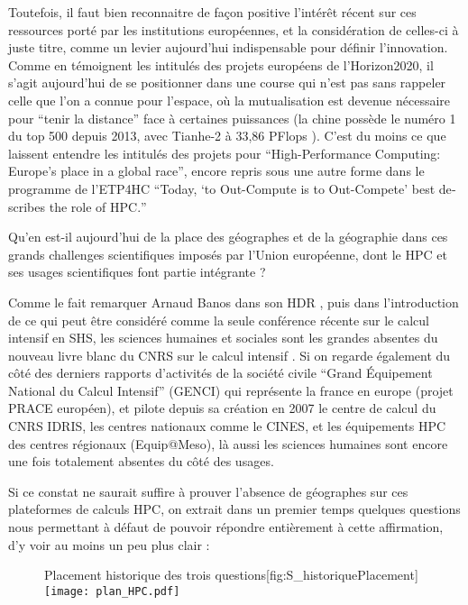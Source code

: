 Toutefois, il faut bien reconnaitre de façon positive l'intérêt récent sur ces ressources porté par les institutions européennes, et la considération de celles-ci à juste titre, comme un levier aujourd'hui indispensable pour définir l'innovation. Comme en témoignent les intitulés des projets européens de l'Horizon2020, il s'agit aujourd'hui de se positionner dans une course qui n'est pas sans rappeler celle que l'on a connue pour l'espace, où la mutualisation est devenue nécessaire pour \enquote{tenir la distance} face à certaines puissances (la chine possède le numéro 1 du top 500 depuis 2013, avec Tianhe-2 à 33,86 PFlops ). C'est du moins ce que laissent entendre les intitulés des projets pour \autocite{HPCHorizon2020} \foreignquote{english}{High-Performance Computing: Europe's place in a global race}, encore repris sous une autre forme dans le programme de l'ETP4HC \autocites{ETP4HPC2012, ETP4HPC2013} \foreignquote{english}{Today, \enquote{to Out-Compute is to Out-Compete} best describes the role of HPC.}

Qu'en est-il aujourd'hui de la place des géographes et de la géographie dans ces grands challenges scientifiques imposés par l'Union européenne, dont le HPC et ses usages scientifiques font partie intégrante ?

Comme le fait remarquer Arnaud Banos dans son HDR \autocite[63]{Banos2013}, puis dans l'introduction de ce qui peut être considéré comme la seule conférence récente sur le calcul intensif en SHS, les sciences humaines et sociales sont les grandes absentes du nouveau livre blanc du CNRS sur le calcul intensif \autocite{COCIN2012}. Si on regarde également du côté des derniers rapports d'activités \autocite{GENCI2014} de la société civile \enquote{Grand Équipement National du Calcul Intensif} (GENCI)  qui représente la france en europe (projet PRACE européen), et pilote depuis sa création en 2007 le centre de calcul du CNRS IDRIS, les centres nationaux comme le CINES, et les équipements HPC des centres régionaux (Equip@Meso), là aussi les sciences humaines sont encore une fois totalement absentes du côté des usages.

Si ce constat ne saurait suffire à prouver l'absence de géographes sur ces plateformes de calculs HPC, on extrait dans un premier temps quelques questions nous permettant à défaut de pouvoir répondre entièrement à cette affirmation, d'y voir au moins un peu plus clair :

\begin{figure}[h]
\begin{sidecaption}[fortoc]{Placement historique des trois questions}[fig:S_historiquePlacement]
  \centering
 \texttt{[image: plan\_HPC.pdf]}
  \end{sidecaption}
\end{figure}

